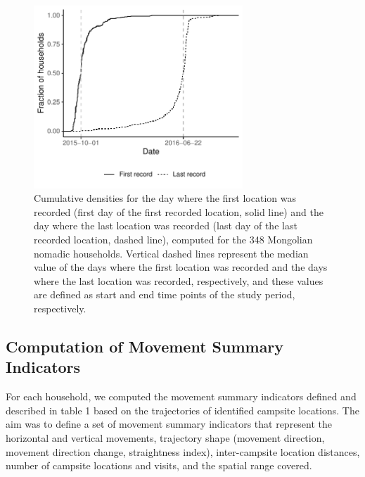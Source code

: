 \documentclass[]{elsarticle} %
\begin{document}
\begin{figure}[H]

{\centering \includegraphics[width=0.7\textwidth]{../figures/gap-filtering-study-period-plot2-1} 

}

\caption{Cumulative densities for the day where the first location was recorded (first day of the first recorded location, solid line) and the day where the last location was recorded (last day of the last recorded location, dashed line), computed for the 348 Mongolian nomadic households. Vertical dashed lines represent the median value of the days where the first location was recorded and the days where the last location was recorded, respectively, and these values are defined as start and end time points of the study period, respectively. \label{fig:gap_filtering_study_period_plot2}}\label{fig:gap-filtering-study-period-plot2}
\end{figure}

\hypertarget{computation-of-movement-summary-indicators}{%
\subsection{Computation of Movement Summary
Indicators}\label{computation-of-movement-summary-indicators}}

For each household, we computed the movement summary indicators defined
and described in table 1 based on the trajectories of identified
campsite locations. The aim was to define a set of movement summary
indicators that represent the horizontal and vertical movements,
trajectory shape (movement direction, movement direction change,
straightness index), inter-campsite location distances, number of
campsite locations and visits, and the spatial range covered.
\end{document}
